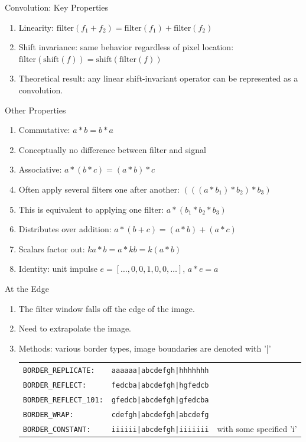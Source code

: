 \begin{frame}{Convolution: Key Properties}
    \begin{enumerate}
        \item Linearity: $\mathrm{filter}(f_1 + f_2) = \mathrm{filter}(f_1) + \mathrm{filter}(f_2)$
        \item Shift invariance: same behavior regardless of pixel location: $\mathrm{filter}(\mathrm{shift}(f)) = \mathrm{shift}(\mathrm{filter}(f))$
        \item Theoretical result: any linear shift-invariant operator can be represented as a convolution.
    \end{enumerate}
    Other Properties
    \begin{enumerate}
        \item Commutative: $a \ast b = b \ast a$
        \item Conceptually no difference between filter and signal
        \item Associative: $a \ast (b \ast c) = (a \ast b) \ast c$
        \item Often apply several filters one after another: $(((a \ast b_1) \ast b_2) \ast b_3)$
        \item This is equivalent to applying one filter: $a \ast (b_1 \ast b_2 \ast b_3)$
        \item Distributes over addition: $a \ast (b + c) = (a \ast b) + (a \ast c)$
        \item Scalars factor out: $ka \ast b = a \ast kb = k (a \ast b)$
        \item Identity: unit impulse $e = [\dots, 0, 0, 1, 0, 0, \dots]$, $a \ast e = a$
    \end{enumerate}

\end{frame}


\begin{frame}{At the Edge}
    \begin{enumerate}
        \item The filter window falls off the edge of the image.
        \item Need to extrapolate the image.
        \item Methods: various border types, image boundaries are denoted with '|'
        \begin{tabular}{lcl}
            \lstinline!BORDER_REPLICATE:! & \texttt{aaaaaa|abcdefgh|hhhhhhh}&\\
            \lstinline!BORDER_REFLECT:! & \texttt{fedcba|abcdefgh|hgfedcb}&\\
            \lstinline!BORDER_REFLECT_101:! & \texttt{gfedcb|abcdefgh|gfedcba}&\\
            \lstinline!BORDER_WRAP:! &         \texttt{cdefgh|abcdefgh|abcdefg}&\\
            \lstinline!BORDER_CONSTANT:! &      \texttt{iiiiii|abcdefgh|iiiiiii}&  with some specified 'i'\\
        \end{tabular}
    \end{enumerate}
\end{frame}




